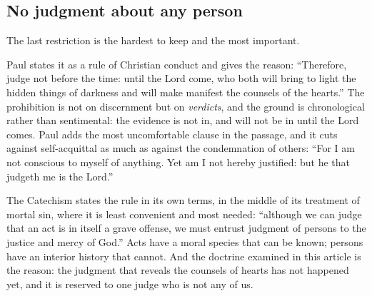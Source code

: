 \subsection{No judgment about any person}

The last restriction is the hardest to keep and the most important.

Paul states it as a rule of Christian conduct and gives the reason: ``Therefore, judge not before the time: until the Lord come, who both will bring to light the hidden things of darkness and will make manifest the counsels of the hearts.'' The prohibition is not on discernment but on \emph{verdicts}, and the ground is chronological rather than sentimental: the evidence is not in, and will not be in until the Lord comes. Paul adds the most uncomfortable clause in the passage, and it cuts against self-acquittal as much as against the condemnation of others: ``For I am not conscious to myself of anything. Yet am I not hereby justified: but he that judgeth me is the Lord.''

The Catechism states the rule in its own terms, in the middle of its treatment of mortal sin, where it is least convenient and most needed: ``although we can judge that an act is in itself a grave offense, we must entrust judgment of persons to the justice and mercy of God.'' Acts have a moral species that can be known; persons have an interior history that cannot. And the doctrine examined in this article is the reason: the judgment that reveals the counsels of hearts has not happened yet, and it is reserved to one judge who is not any of us.

